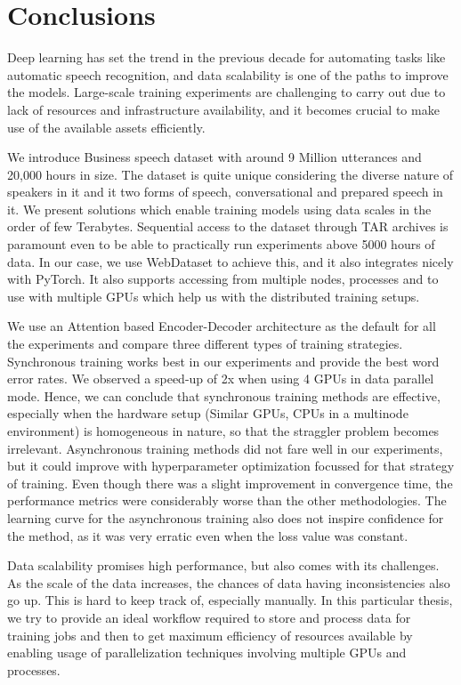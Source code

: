 \chapter{Conclusions}
\label{chapter:conclusions}

Deep learning has set the trend in the previous decade for automating tasks like automatic speech recognition, and data scalability is one of the paths to improve the models. Large-scale training experiments are challenging to carry out due to lack of resources and infrastructure availability, and it becomes crucial to make use of the available assets efficiently.

We introduce Business speech dataset with around 9 Million utterances and 20,000 hours in size. The dataset is quite unique considering the diverse nature of speakers in it and it two forms of speech, conversational and prepared speech in it. We present solutions which enable training models using data scales in the order of few Terabytes. Sequential access to the dataset through TAR archives is paramount even to be able to practically run experiments above 5000 hours of data. In our case, we use WebDataset to achieve this, and it also integrates nicely with PyTorch. It also supports accessing from multiple nodes, processes and to use with multiple GPUs which help us with the distributed training setups. 

We use an Attention based Encoder-Decoder architecture as the default for all the experiments and compare three different types of training strategies. Synchronous training works best in our experiments and provide the best word error rates. We observed a speed-up of 2x when using 4 GPUs in data parallel mode. Hence, we can conclude that synchronous training methods are effective, especially when the hardware setup (Similar GPUs, CPUs in a multinode environment) is homogeneous in nature, so that the straggler problem becomes irrelevant. Asynchronous training methods did not fare well in our experiments, but it could improve with hyperparameter optimization focussed for that strategy of training.  Even though there was a slight improvement in convergence time, the performance metrics were considerably worse than the other methodologies. The learning curve for the asynchronous training also does not inspire confidence for the method, as it was very erratic even when the loss value was constant. 

Data scalability promises high performance, but also comes with its challenges. As the scale of the data increases, the chances of data having inconsistencies also go up. This is hard to keep track of, especially manually. In this particular thesis, we try to provide an ideal workflow required to store and process data for training jobs and then to get maximum efficiency of resources available by enabling usage of parallelization techniques involving multiple GPUs and processes. 